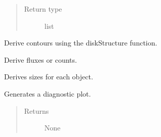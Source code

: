 \documentclass[a4paper,12pt,english]{sphinxmanual}
\begin{document}
\begin{fulllineitems}
\begin{fulllineitems}
\begin{quote}
\begin{description}
\item[{Return type}] \leavevmode
list

\end{description}\end{quote}

\end{fulllineitems}


\begin{fulllineitems}
\label{analysis:analysis.sourceFinder.sourceFinder.getContours}
Derive contours using the diskStructure function.

\end{fulllineitems}


\begin{fulllineitems}
\label{analysis:analysis.sourceFinder.sourceFinder.getFluxes}
Derive fluxes or counts.

\end{fulllineitems}


\begin{fulllineitems}
\label{analysis:analysis.sourceFinder.sourceFinder.getSizes}
Derives sizes for each object.

\end{fulllineitems}


\begin{fulllineitems}
\label{analysis:analysis.sourceFinder.sourceFinder.plot}
Generates a diagnostic plot.
\begin{quote}\begin{description}
\item[{Returns}] \leavevmode
None

\end{description}\end{quote}

\end{fulllineitems}



\end{fulllineitems}
\end{document}
